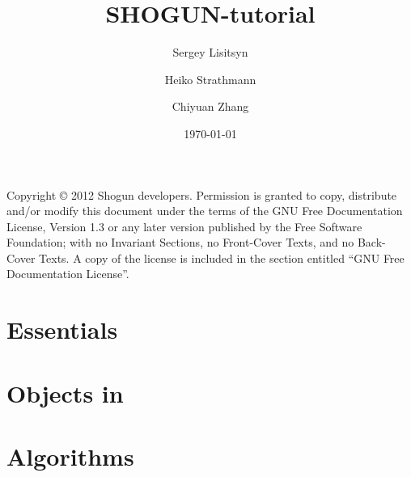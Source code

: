 \documentclass{shogun_tutorial}
\title{SHOGUN-tutorial}
\date{\today}
\author
{
Sergey Lisitsyn \and 
Heiko Strathmann\and 
Chiyuan Zhang \and 
}
\begin{document}
	\maketitle
	Copyright \copyright{}  2012 Shogun developers.
    Permission is granted to copy, distribute and/or modify this document
    under the terms of the GNU Free Documentation License, Version 1.3
    or any later version published by the Free Software Foundation;
    with no Invariant Sections, no Front-Cover Texts, and no Back-Cover Texts.
    A copy of the license is included in the section entitled ``GNU
    Free Documentation License''.
    
    
	\tableofcontents
	\listoftodos
	\part{Essentials}
	
	
	\part{Objects in \shogun{}}
	
	
	
	\part{Algorithms}
	
	
	
	
	
	
	\begin{appendix}
	
	\end{appendix}
	
	
	 
\end{document}
